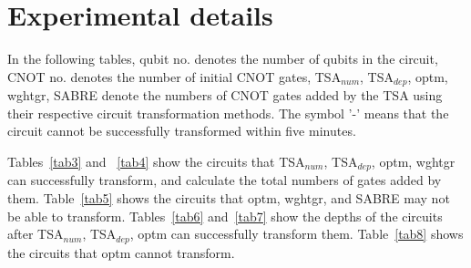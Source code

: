 \documentclass[journal]{IEEEtran}
\begin{document}
	
	
	\newpage
	\appendix
	\section*{Experimental details} %
	In the following tables, qubit no. denotes the number of qubits in the circuit, CNOT no. denotes the number of initial CNOT gates, TSA$_{num}$, TSA$_{dep}$, optm, wghtgr, SABRE denote the numbers of CNOT gates added by the TSA using their respective circuit transformation methods. %
	The symbol '-' means that the circuit cannot be successfully transformed within five minutes.
	
	Tables~\ref{tab3} and ~\ref{tab4} show the circuits that TSA$_{num}$, TSA$_{dep}$, optm, wghtgr can successfully transform, and calculate the total numbers of gates added by them. Table~\ref{tab5} shows the circuits that optm, wghtgr, and SABRE may not be able to transform. Tables~\ref{tab6} and~\ref{tab7} show the depths of the circuits after TSA$_{num}$, TSA$_{dep}$, optm can successfully transform them.  Table~\ref{tab8} shows the circuits that optm cannot transform.
	
\end{document}
